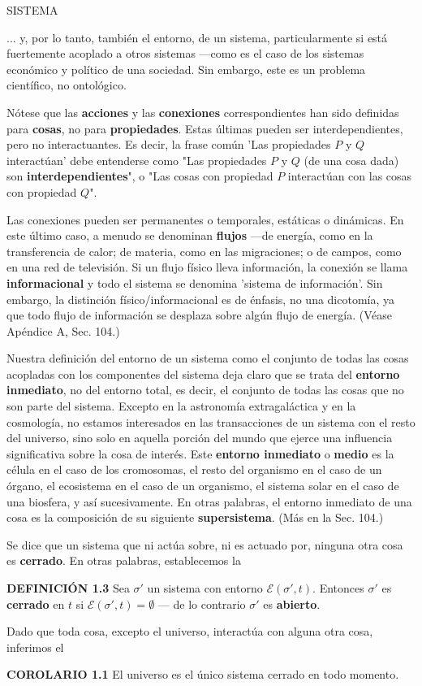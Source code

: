 \fancyhf{}
\fancyhead[r]{\thepage}
\newpage
\begin{center}
{\fontsize{16}{18}\selectfont SISTEMA }
\end{center}
\vspace{0.5cm}

{\fontsize{13}{15}\selectfont
... y, por lo tanto, también el entorno, de un sistema, particularmente si está fuertemente acoplado a otros sistemas —como es el caso de los sistemas económico y político de una sociedad. Sin embargo, este es un problema científico, no ontológico.

Nótese que las \textbf{acciones} y las \textbf{conexiones} correspondientes han sido definidas para \textbf{cosas}, no para \textbf{propiedades}. Estas últimas pueden ser interdependientes, pero no interactuantes. Es decir, la frase común 'Las propiedades $P$ y $Q$ interactúan' debe entenderse como "Las propiedades $P$ y $Q$ (de una cosa dada) son \textbf{interdependientes}", o "Las cosas con propiedad $P$ interactúan con las cosas con propiedad $Q$".

Las conexiones pueden ser permanentes o temporales, estáticas o dinámicas. En este último caso, a menudo se denominan \textbf{flujos} —de energía, como en la transferencia de calor; de materia, como en las migraciones; o de campos, como en una red de televisión. Si un flujo físico lleva información, la conexión se llama \textbf{informacional} y todo el sistema se denomina 'sistema de información'. Sin embargo, la distinción físico/informacional es de énfasis, no una dicotomía, ya que todo flujo de información se desplaza sobre algún flujo de energía. (Véase Apéndice A, Sec. 104.)

Nuestra definición del entorno de un sistema como el conjunto de todas las cosas acopladas con los componentes del sistema deja claro que se trata del \textbf{entorno inmediato}, no del entorno total, es decir, el conjunto de todas las cosas que no son parte del sistema. Excepto en la astronomía extragaláctica y en la cosmología, no estamos interesados en las transacciones de un sistema con el resto del universo, sino solo en aquella porción del mundo que ejerce una influencia significativa sobre la cosa de interés. Este \textbf{entorno inmediato} o \textbf{medio} es la célula en el caso de los cromosomas, el resto del organismo en el caso de un órgano, el ecosistema en el caso de un organismo, el sistema solar en el caso de una biosfera, y así sucesivamente. En otras palabras, el entorno inmediato de una cosa es la composición de su siguiente \textbf{supersistema}. (Más en la Sec. 104.)

Se dice que un sistema que ni actúa sobre, ni es actuado por, ninguna otra cosa es \textbf{cerrado}. En otras palabras, establecemos la

\textbf{DEFINICIÓN 1.3} Sea $\sigma'$ un sistema con entorno $\mathcal{E}(\sigma', t)$. Entonces $\sigma'$ es \textbf{cerrado} en $t$ si $\mathcal{E}(\sigma', t) = \emptyset$ — de lo contrario $\sigma'$ es \textbf{abierto}.

Dado que toda cosa, excepto el universo, interactúa con alguna otra cosa, inferimos el

\textbf{COROLARIO 1.1} El universo es el único sistema cerrado en todo momento.
}
\newpage

